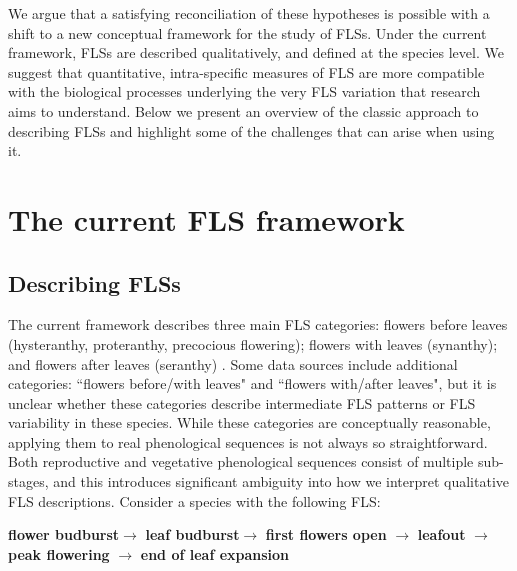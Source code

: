\documentclass{article}
\begin{document}
\noindent We argue that a satisfying reconciliation of these hypotheses is possible with a shift to a new conceptual framework for the study of FLSs. Under the current framework, FLSs are described qualitatively, and defined at the species level. We suggest that quantitative, intra-specific measures of FLS are more compatible with the biological processes underlying the very FLS variation that research aims to understand. Below we present an overview of the classic approach to describing FLSs and highlight some of the challenges that can arise when using it. \\

\section*{The current FLS framework}
\subsection*{Describing FLSs}
\noindent  The current framework describes three main FLS categories: flowers before leaves (hysteranthy, proteranthy, precocious flowering); flowers with leaves (synanthy); and flowers after leaves (seranthy) \citep{Lamont2011, Heinig1899}. Some data sources \citep[e.g.][]{Burns1990,Barnes2004} include additional categories: ``flowers before/with leaves" and ``flowers with/after leaves", but it is unclear whether these categories describe intermediate FLS patterns or FLS variability in these species. While these categories are conceptually reasonable, applying them to real phenological sequences is not always so straightforward.\\

\noindent Both reproductive and vegetative phenological sequences consist of multiple sub-stages, and this introduces significant ambiguity into how we interpret qualitative FLS descriptions. Consider a species with the following FLS:\\

\begin{center}
\textbf{flower budburst}$\rightarrow$ \textbf{leaf budburst}$\rightarrow$ \textbf{first flowers open} $\rightarrow$ \textbf{leafout} $\rightarrow$ \textbf{peak flowering} $\rightarrow$ \textbf{end of leaf expansion} \\
\end{center}
\end{document}
